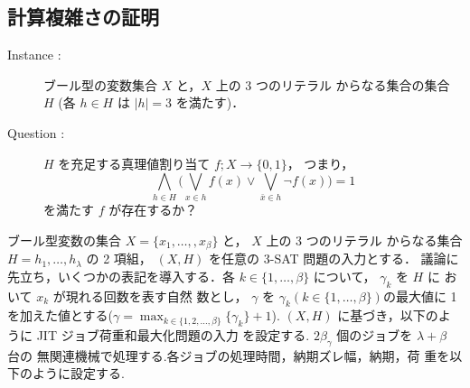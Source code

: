 \documentclass[12pt]{optlab-bachelor}
\begin{document}
\subsection{計算複雑さの証明}
\begin{description}
  \item[Instance : ] ブール型の変数集合 $X$ と，$X$ 上の 3 つのリテラル
  からなる集合の集合 $H$ (各 $h \in H$ は $|h| = 3$ を満たす)．
  \item[Question : ] $H$ を充足する真理値割り当て $f ; X \to \{0,1\}$，
  つまり，
  $$\displaystyle \bigwedge_{h \in H} \bigg(\bigvee_{x \in h}f(x) \lor
  \bigvee_{\bar x \in h}\lnot f(x) \bigg) = 1$$
  を満たす $f$ が存在するか？
\end{description}

ブール型変数の集合 $X = \{x_1,\ldots,,x_β\}$ と， $X$ 上の 3 つのリテラル
からなる集合 $H = {h_1,\ldots,h_{\lambda}}$ の 2 項組， $(X,H)$ を任意の
3-SAT 問題の入力とする．
議論に先立ち，いくつかの表記を導入する．各 $k \in \{1,\ldots,\beta\}$
について， $\gamma_k$ を $H$ に おいて $x_k$ が現れる回数を表す自然
数とし， $\gamma$ を $\gamma_k ( k \in \{1,\ldots,\beta\} )$の最大値に
1 を加えた値とする($\displaystyle \gamma = \max_{k \in \{1,2,\ldots, \beta\}} \{\gamma_k \}+ 1$).
$(X, H)$ に基づき，以下のように JIT ジョブ荷重和最大化問題の入力
を設定する. $2\beta_{\gamma}$ 個のジョブを $\lambda + \beta$ 台の
無関連機械で処理する.各ジョブの処理時間，納期ズレ幅，納期，荷
重を以下のように設定する.
\end{document}
